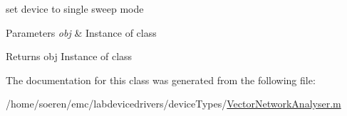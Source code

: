 set device to single sweep mode 


\begin{DoxyParams}{Parameters}
{\em obj} & Instance of class\\
\hline
\end{DoxyParams}
\begin{DoxyReturn}{Returns}
obj Instance of class 
\end{DoxyReturn}


The documentation for this class was generated from the following file\+:\begin{DoxyCompactItemize}
\item 
/home/soeren/emc/labdevicedrivers/device\+Types/\hyperlink{_vector_network_analyser_8m}{Vector\+Network\+Analyser.\+m}\end{DoxyCompactItemize}
